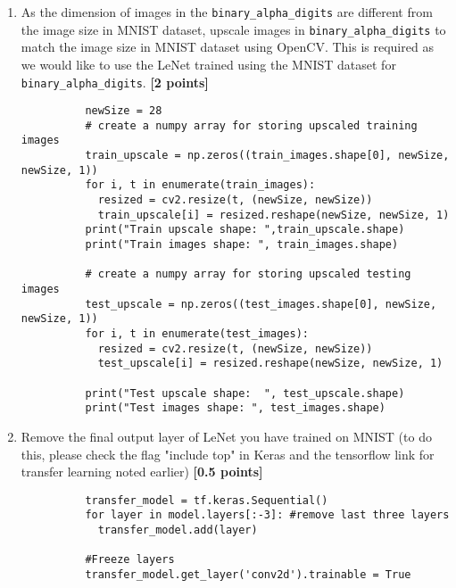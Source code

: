 \begin{enumerate}
\begin{lstlisting}
          train_images, train_labels = tfds.as_numpy(train_ds)
          test_images, test_labels   = tfds.as_numpy(test_ds)

          print('Image size:', train_images[0].shape)
          print('Training data size:',train_images.shape)
          print('Training labels size:', train_labels.shape)
          print('Testing data size:', test_images.shape)
        \end{lstlisting}
  \item As the dimension of images in the \lstinline{binary_alpha_digits} are different from the image size in MNIST dataset, upscale images in \lstinline{binary_alpha_digits} to match the image size in MNIST dataset using OpenCV. This is required as we would like to use the LeNet trained using the MNIST dataset for \lstinline{binary_alpha_digits}. {\bf [2 points]}
        \begin{lstlisting}
          newSize = 28
          # create a numpy array for storing upscaled training images
          train_upscale = np.zeros((train_images.shape[0], newSize, newSize, 1))
          for i, t in enumerate(train_images):
            resized = cv2.resize(t, (newSize, newSize))
            train_upscale[i] = resized.reshape(newSize, newSize, 1)
          print("Train upscale shape: ",train_upscale.shape)
          print("Train images shape: ", train_images.shape)

          # create a numpy array for storing upscaled testing images
          test_upscale = np.zeros((test_images.shape[0], newSize, newSize, 1))
          for i, t in enumerate(test_images):
            resized = cv2.resize(t, (newSize, newSize))
            test_upscale[i] = resized.reshape(newSize, newSize, 1)

          print("Test upscale shape:  ", test_upscale.shape)
          print("Test images shape: ", test_images.shape)
        \end{lstlisting}
  \item Remove the final output layer of LeNet you have trained on MNIST (to do this, please check the flag "include top" in Keras and the tensorflow link for transfer learning noted earlier) {\bf [0.5 points]}
        \begin{lstlisting}
          transfer_model = tf.keras.Sequential()
          for layer in model.layers[:-3]: #remove last three layers
            transfer_model.add(layer)

          #Freeze layers
          transfer_model.get_layer('conv2d').trainable = True


\end{lstlisting}
\end{enumerate}
